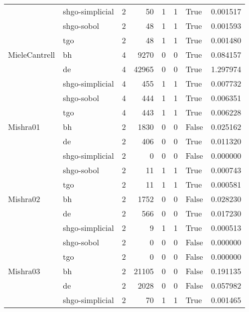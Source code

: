 \begin{longtable}{llrrrrlr}
         & shgo-simplicial &     2 &       50 &      1 &       1 &    True &    0.001517 \\
         & shgo-sobol &     2 &       48 &      1 &       1 &    True &    0.001593 \\
         & tgo &     2 &       48 &      1 &       1 &    True &    0.001480 \\
MieleCantrell & bh &     4 &     9270 &      0 &       0 &    True &    0.084157 \\
         & de &     4 &    42965 &      0 &       0 &    True &    1.297974 \\
         & shgo-simplicial &     4 &      455 &      1 &       1 &    True &    0.007732 \\
         & shgo-sobol &     4 &      444 &      1 &       1 &    True &    0.006351 \\
         & tgo &     4 &      443 &      1 &       1 &    True &    0.006228 \\
Mishra01 & bh &     2 &     1830 &      0 &       0 &   False &    0.025162 \\
         & de &     2 &      406 &      0 &       0 &    True &    0.011320 \\
         & shgo-simplicial &     2 &        0 &      0 &       0 &   False &    0.000000 \\
         & shgo-sobol &     2 &       11 &      1 &       1 &    True &    0.000743 \\
         & tgo &     2 &       11 &      1 &       1 &    True &    0.000581 \\
Mishra02 & bh &     2 &     1752 &      0 &       0 &   False &    0.028230 \\
         & de &     2 &      566 &      0 &       0 &    True &    0.017230 \\
         & shgo-simplicial &     2 &        9 &      1 &       1 &    True &    0.000513 \\
         & shgo-sobol &     2 &        0 &      0 &       0 &   False &    0.000000 \\
         & tgo &     2 &        0 &      0 &       0 &   False &    0.000000 \\
Mishra03 & bh &     2 &    21105 &      0 &       0 &   False &    0.191135 \\
         & de &     2 &     2028 &      0 &       0 &   False &    0.057982 \\
         & shgo-simplicial &     2 &       70 &      1 &       1 &    True &    0.001465 \\

\end{longtable}
